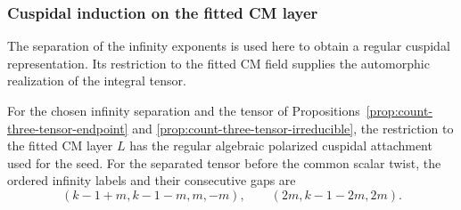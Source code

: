\subsubsection{Cuspidal induction on the fitted CM layer}
\label{par:count-three-cuspidal-induction}

The separation of the infinity exponents is used here to obtain a regular cuspidal representation. Its restriction to the fitted CM field supplies the automorphic realization of the integral tensor.

\begin{proposition}\label{prop:count-three-cuspidal-induction}
For the chosen infinity separation and the tensor of
Propositions~\ref{prop:count-three-tensor-endpoint}
and \ref{prop:count-three-tensor-irreducible}, the restriction to the fitted CM layer \(L\) has the regular algebraic polarized cuspidal attachment used for the seed. For the separated tensor before the common scalar twist, the ordered infinity labels and their consecutive gaps are 
\[
 (k-1+m,k-1-m,m,-m),\qquad(2m,k-1-2m,2m).
\]

\end{proposition}

